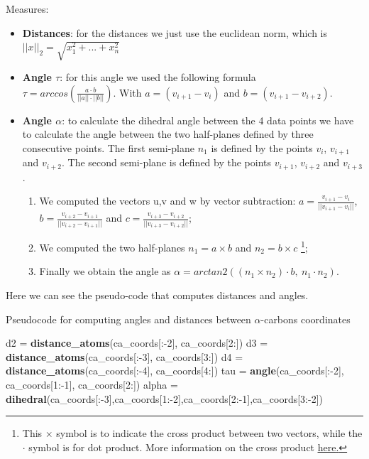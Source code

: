 Measures:
\begin{itemize}
    \item \textbf{Distances}: for the distances we just use the euclidean norm, which is \\ {$||x||_2 = \sqrt{x_1^2 + ... + x_n^2}$}
    \item \textbf{Angle $\tau$}: for this angle we used the following formula \\ $\tau = arccos(\frac{a \cdot b}{||a|| \cdot ||b||})$. With $a = (v_{i+1}-v_i)$ and $b = (v_{i+1}-v_{i+2})$.  
    \item \textbf{Angle $\alpha$}: to calculate the dihedral angle between the 4 data points we have to calculate the angle between the two half-planes defined by three consecutive points. The first semi-plane $n_1$ is defined by the points $v_i$, $v_{i+1}$ and $v_{i+2}$. The second semi-plane is defined by the points $v_{i+1}$, $v_{i+2}$ and $v_{i+3}$.

    \pagebreak

    \begin{enumerate}
            \item We computed the vectors u,v and w by vector subtraction: $a = \frac{v_{i+1}-v_i}{||v_{i+1}-v_i||}$, $b = \frac{v_{i+2}-v_{i+1}}{||v_{i+2}-v_{i+1}||}$ and $c = \frac{v_{i+3}-v_{i+2}}{||v_{i+3}-v_{i+2}||}$;
            \item We computed the two half-planes $n_1 = a \times b$ and $n_2 = b \times c$ \footnote{This $\times$ symbol is to indicate the cross product between two vectors, while the $\cdot$ symbol is for dot product. More information on the cross product \href{https://en.wikipedia.org/wiki/Cross\_product}{\underline{here}.}};
            \item Finally we obtain the angle as $\alpha = arctan2((n_1\times n_2)\cdot b,\ n_1\cdot n_2)$.
    \end{enumerate}
\end{itemize}

Here we can see the pseudo-code that computes distances and angles.

\begin{algorithm}[ht]
    \caption{Pseudocode for computing angles and distances between $\alpha$-carbons coordinates}\label{alg:two}
    \begin{algorithmic}
        
        \STATE d2 = \textbf{distance\_atoms}(ca\_coords[:-2], ca\_coords[2:])
        \STATE d3 = \textbf{distance\_atoms}(ca\_coords[:-3], ca\_coords[3:])
        \STATE d4 = \textbf{distance\_atoms}(ca\_coords[:-4], ca\_coords[4:])
        \STATE tau = \textbf{angle}(ca\_coords[:-2], ca\_coords[1:-1], ca\_coords[2:])
        \STATE alpha = \textbf{dihedral}(ca\_coords[:-3],ca\_coords[1:-2],ca\_coords[2:-1],ca\_coords[3:-2])
    \end{algorithmic}
\end{algorithm}

